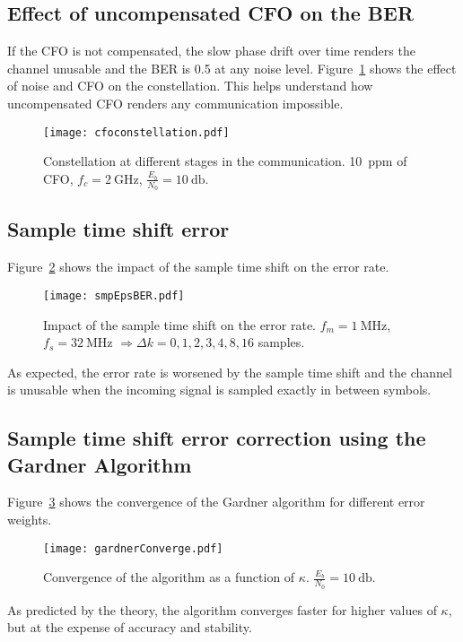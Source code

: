 \subsection{Effect of uncompensated CFO on the BER}
If the CFO is not compensated, the slow phase drift over time renders the channel unusable and the BER is 0.5 at any noise level. Figure~\ref{fig:cfoconst} shows the effect of noise and CFO on the constellation. This helps understand how uncompensated CFO renders any communication impossible.
\begin{figure}
  \centering
  \texttt{[image: cfoconstellation.pdf]}
  \caption[Constellation at different stages in the communication.]{Constellation at different stages in the communication. \SI{10}{ppm} of CFO, $f_c = \SI{2}{\giga\hertz}$, $\frac{E_b}{N_0} = \SI{10}{\decibel}$.\label{fig:cfoconst}}
\end{figure}

\subsection{Sample time shift error}
Figure~\ref{fig:smpEpsBER} shows the impact of the sample time shift on the error rate.
\begin{figure}[htbp]
\centering
\texttt{[image: smpEpsBER.pdf]}
\caption[Impact of the sample time shift on the error rate.]{Impact of the sample time shift on the error rate. $f_m = \SI{1}{\mega\hertz}$, $f_s = \SI{32}{\mega\hertz}$ $\Rightarrow \Delta k = 0, 1, 2, 3, 4, 8, 16$ samples.\label{fig:smpEpsBER}}
\end{figure}
As expected, the error rate is worsened by the sample time shift and the channel is unusable when the incoming signal is sampled exactly in between symbols.

\subsection{Sample time shift error correction using the Gardner Algorithm}
Figure~\ref{fig:gConvK} shows the convergence of the Gardner algorithm for different error weights.
\begin{figure}[htbp]
    \centering
    \texttt{[image: gardnerConverge.pdf]}
    \caption[Convergence of the algorithm as a function of $\kappa$.]{Convergence of the algorithm as a function of $\kappa$. $\frac{E_b}{N_0} = \SI{10}{\decibel}$.\label{fig:gConvK}}
\end{figure}
As predicted by the theory, the algorithm converges faster for higher values of $\kappa$, but at the expense of accuracy and stability.

